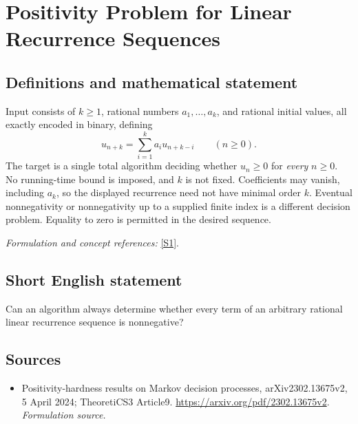 \documentclass[11pt]{article}
\begin{document}
\section*{\texorpdfstring{Positivity Problem for Linear Recurrence Sequences}{Positivity Problem for Linear Recurrence Sequences}}\label{30006843}
\subsection{Definitions and mathematical statement}
Input consists of $k\ge1$, rational numbers $a_1,\ldots,a_k$, and rational initial values, all exactly encoded in binary, defining
\[
 u_{n+k}=\sum_{i=1}^k a_i u_{n+k-i}\qquad(n\ge0).
\]
The target is a single total algorithm deciding whether $u_n\ge0$ for \emph{every} $n\ge0$. No running-time bound is imposed, and $k$ is not fixed. Coefficients may vanish, including $a_k$, so the displayed recurrence need not have minimal order $k$. Eventual nonnegativity or nonnegativity up to a supplied finite index is a different decision problem. Equality to zero is permitted in the desired sequence.
\par\smallskip\textit{Formulation and concept references:} \href{https://arxiv.org/pdf/2302.13675v2}{[S1]}.

\subsection{Short English statement}
Can an algorithm always determine whether every term of an arbitrary rational linear recurrence sequence is nonnegative?
\subsection{Sources}
\begin{itemize}
\item[S1]Positivity-hardness results on Markov decision processes, arXiv2302.13675v2, 5 April 2024; TheoretiCS3 Article9.
\url{https://arxiv.org/pdf/2302.13675v2}.
\textit{Formulation source.}
\end{itemize}
\end{document}
